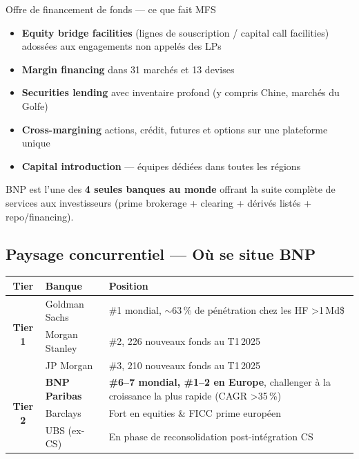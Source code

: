 \documentclass[11pt,a4paper]{article}
\begin{document}
\begin{graybox}{Offre de financement de fonds --- ce que fait MFS}
\begin{itemize}[nosep, leftmargin=12pt]
\item \textbf{Equity bridge facilities} (lignes de souscription / capital call facilities)
      adoss\'ees aux engagements non appel\'es des LPs
\item \textbf{Margin financing} dans 31 march\'es et 13 devises
\item \textbf{Securities lending} avec inventaire profond (y compris Chine, march\'es du Golfe)
\item \textbf{Cross-margining} actions, cr\'edit, futures et options sur une plateforme unique
\item \textbf{Capital introduction} --- \'equipes d\'edi\'ees dans toutes les r\'egions
\end{itemize}
BNP est l'une des \textbf{4 seules banques au monde} offrant la suite compl\`ete
de services aux investisseurs (prime brokerage + clearing + d\'eriv\'es list\'es +
repo/financing).
\end{graybox}

\subsection{Paysage concurrentiel --- O\`u se situe BNP}

\begin{center}
\small
\begin{tabular}{@{}clp{6.5cm}@{}}
\toprule
\textbf{Tier} & \textbf{Banque} & \textbf{Position} \\
\midrule
\multirow{3}{*}{\textbf{Tier 1}} & Goldman Sachs & \#1 mondial, $\sim$63\,\% de p\'en\'etration chez les HF >1\,Md\$ \\
 & Morgan Stanley & \#2, 226 nouveaux fonds au T1\,2025 \\
 & JP Morgan & \#3, 210 nouveaux fonds au T1\,2025 \\
\midrule
\multirow{3}{*}{\textbf{Tier 2}} & \textbf{BNP Paribas} & \textbf{\#6--7 mondial, \#1--2 en Europe},
  challenger \`a la croissance la plus rapide (CAGR >35\,\%) \\
 & Barclays & Fort en equities \& FICC prime europ\'een \\
 & UBS (ex-CS) & En phase de reconsolidation post-int\'egration CS \\
\bottomrule
\end{tabular}
\end{center}
\end{document}

